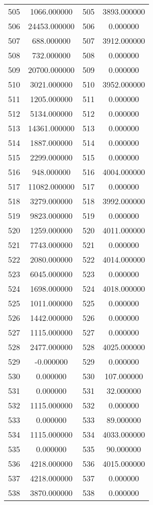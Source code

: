 \documentclass[12pt]{article}
\begin{document}
\begin{longtable}{@{}cccc@{}}
505 & 1066.000000 & 505 & 3893.000000 \\
506 & 24453.000000 & 506 & 0.000000 \\
507 & 688.000000 & 507 & 3912.000000 \\
508 & 732.000000 & 508 & 0.000000 \\
509 & 20700.000000 & 509 & 0.000000 \\
510 & 3021.000000 & 510 & 3952.000000 \\
511 & 1205.000000 & 511 & 0.000000 \\
512 & 5134.000000 & 512 & 0.000000 \\
513 & 14361.000000 & 513 & 0.000000 \\
514 & 1887.000000 & 514 & 0.000000 \\
515 & 2299.000000 & 515 & 0.000000 \\
516 & 948.000000 & 516 & 4004.000000 \\
517 & 11082.000000 & 517 & 0.000000 \\
518 & 3279.000000 & 518 & 3992.000000 \\
519 & 9823.000000 & 519 & 0.000000 \\
520 & 1259.000000 & 520 & 4011.000000 \\
521 & 7743.000000 & 521 & 0.000000 \\
522 & 2080.000000 & 522 & 4014.000000 \\
523 & 6045.000000 & 523 & 0.000000 \\
524 & 1698.000000 & 524 & 4018.000000 \\
525 & 1011.000000 & 525 & 0.000000 \\
526 & 1442.000000 & 526 & 0.000000 \\
527 & 1115.000000 & 527 & 0.000000 \\
528 & 2477.000000 & 528 & 4025.000000 \\
529 & -0.000000 & 529 & 0.000000 \\
530 & 0.000000 & 530 & 107.000000 \\
531 & 0.000000 & 531 & 32.000000 \\
532 & 1115.000000 & 532 & 0.000000 \\
533 & 0.000000 & 533 & 89.000000 \\
534 & 1115.000000 & 534 & 4033.000000 \\
535 & 0.000000 & 535 & 90.000000 \\
536 & 4218.000000 & 536 & 4015.000000 \\
537 & 4218.000000 & 537 & 0.000000 \\
538 & 3870.000000 & 538 & 0.000000 \\

\end{longtable}
\end{document}
